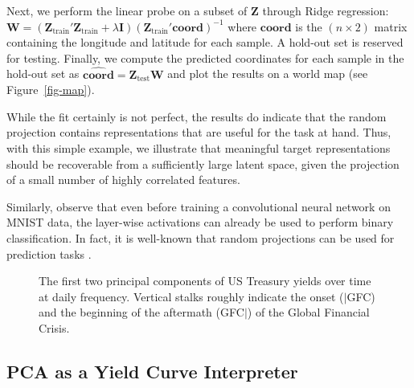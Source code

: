 \documentclass{article}
\theoremstyle{plain}
\theoremstyle{definition}
\theoremstyle{remark}
\begin{document}
Next, we perform the linear probe on a subset of \(\mathbf{Z}\) through Ridge regression: \(\mathbf{W} = (\mathbf{Z}_{\text{train}}'\mathbf{Z}_{\text{train}} + \lambda \mathbf{I}) (\mathbf{Z}_{\text{train}}'\textbf{coord})^{-1}\) where \(\textbf{coord}\) is the \((n \times 2)\) matrix containing the longitude and latitude for each sample. A hold-out set is reserved for testing. Finally, we compute the predicted coordinates for each sample in the hold-out set as \(\widehat{\textbf{coord}}=\mathbf{Z}_{\text{test}}\mathbf{W}\) and plot the results on a world map (see Figure~\ref{fig-map}).  

While the fit certainly is not perfect, the results do indicate that the random projection contains representations that are useful for the task at hand. Thus, with this simple example, we illustrate that meaningful target representations should be recoverable from a sufficiently large latent space, given the projection of a small number of highly correlated features. 

Similarly, \citet{alain2018understanding} observe that even before training a convolutional neural network on MNIST data, the layer-wise activations can already be used to perform binary classification. In fact, it is well-known that random projections can be used for prediction tasks \cite{dasgupta2013experiments}.

\begin{figure}[htp]


\caption{\label{fig-pca}The first two principal components of US Treasury yields over time at daily frequency. Vertical stalks roughly indicate the onset ($|$GFC) and the beginning of the aftermath (GFC$|$) of the Global Financial Crisis.}

\end{figure}


\subsection{PCA as a Yield Curve Interpreter}\label{example-principal-component-analysis}
\end{document}
